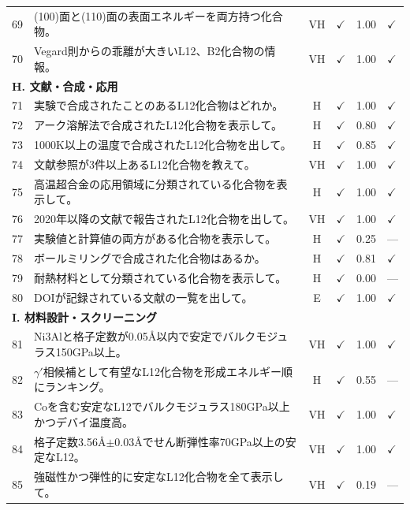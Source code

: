 \documentclass[5p,twocolumn]{elsarticle}
\begin{document}
\begin{longtable}{clcccl}
    69 & (100)面と(110)面の表面エネルギーを両方持つ化合物。 & VH & $\checkmark$ & 1.00 & $\checkmark$ \\
    70 & Vegard則からの乖離が大きいL12、B2化合物の情報。 & VH & $\checkmark$ & 1.00 & $\checkmark$ \\
    \midrule
    \multicolumn{6}{l}{\textbf{H. 文献・合成・応用}} \\
    \midrule
    71 & 実験で合成されたことのあるL12化合物はどれか。 & H & $\checkmark$ & 1.00 & $\checkmark$ \\
    72 & アーク溶解法で合成されたL12化合物を表示して。 & H & $\checkmark$ & 0.80 & $\checkmark$\\
    73 & 1000K以上の温度で合成されたL12化合物を出して。 & H & $\checkmark$ & 0.85 & $\checkmark$\\
    74 & 文献参照が3件以上あるL12化合物を教えて。 & VH & $\checkmark$ & 1.00 & $\checkmark$ \\
    75 & 高温超合金の応用領域に分類されている化合物を表示して。 & H & $\checkmark$ & 1.00 & $\checkmark$ \\
    76 & 2020年以降の文献で報告されたL12化合物を出して。 & VH & $\checkmark$ & 1.00 & $\checkmark$ \\
    77 & 実験値と計算値の両方がある化合物を表示して。 & H & $\checkmark$ & 0.25 & ---\\
    78 & ボールミリングで合成された化合物はあるか。 & H & $\checkmark$ & 0.81 & $\checkmark$\\
    79 & 耐熱材料として分類されている化合物を表示して。 & H & $\checkmark$ & 0.00 & --- \\
    80 & DOIが記録されている文献の一覧を出して。 & E & $\checkmark$ & 1.00 & $\checkmark$ \\
    \midrule
    \multicolumn{6}{l}{\textbf{I. 材料設計・スクリーニング}} \\
    \midrule
    81 & Ni3Alと格子定数が0.05\AA 以内で安定でバルクモジュラス150GPa以上。 & VH & $\checkmark$ & 1.00 & $\checkmark$ \\
    82 & $\gamma'$相候補として有望なL12化合物を形成エネルギー順にランキング。 & H & $\checkmark$ & 0.55 & ---\\
    83 & Coを含む安定なL12でバルクモジュラス180GPa以上かつデバイ温度高。 & VH & $\checkmark$ & 1.00 & $\checkmark$ \\
    84 & 格子定数3.56\AA $\pm$0.03\AA でせん断弾性率70GPa以上の安定なL12。 & VH & $\checkmark$ & 1.00 & $\checkmark$ \\
    85 & 強磁性かつ弾性的に安定なL12化合物を全て表示して。 & VH & $\checkmark$ & 0.19 & ---\\

\end{longtable}
\end{document}
